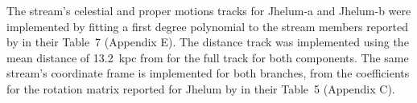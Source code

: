 The stream's celestial and proper motions tracks for Jhelum-a and Jhelum-b were implemented by fitting a first degree polynomial to the stream members reported by \citet{Shipp2019} in their Table~7 (Appendix E). The distance track was implemented using the mean distance of 13.2~kpc from \citet{Shipp2018} for the full track for both components. The same stream's coordinate frame is implemented for both branches, from the coefficients for the rotation matrix reported for Jhelum by \citet{Shipp2019} in their Table~5 (Appendix C).
